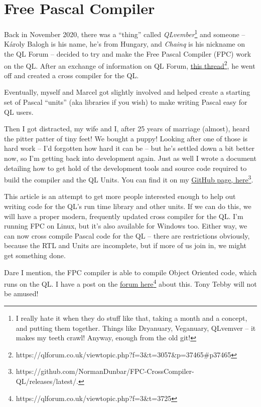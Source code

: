 
\chapter{Free Pascal Compiler}

Back in November 2020, there was a ``thing'' called \emph{QLvember}\footnote{I really hate it when they do stuff like that, taking a month and
a concept, and putting them together. Things like Dryanuary, Veganuary,
QLvemver -- it makes my teeth crawl! Anyway, enough from the old
git!} and someone -- K\'aroly Balogh is his name, he's from Hungary,
and \emph{Chainq} is his nickname on the QL Forum -- decided to try
and make the Free Pascal Compiler (FPC) work on the QL. After an exchange
of information on QL Forum, \href{https://qlforum.co.uk/viewtopic.php?f=3&t=3057&p=37465\#p37465}{this thread}\footnote{https://qlforum.co.uk/viewtopic.php?f=3\&t=3057\&p=37465\#p37465},
he went off and created a cross compiler for the QL.

Eventually, myself and Marcel got slightly involved and helped create
a starting set of Pascal ``units'' (aka libraries if you wish) to
make writing Pascal easy for QL users. 

Then I got distracted, my wife and I, after 25 years of marriage (almost),
heard the pitter patter of tiny feet! We bought a puppy! Looking after
one of those is hard work -- I'd forgotten how hard it can be --
but he's settled down a bit better now, so I'm getting back into development
again. Just as well I wrote a document detailing how to get hold of
the development tools and source code required to build the compiler
and the QL Units. You can find it on my \href{https://github.com/NormanDunbar/FPC-CrossCompiler-QL/releases/latest/.}{GitHub page, here}\footnote{https://github.com/NormanDunbar/FPC-CrossCompiler-QL/releases/latest/.}.

This article is an attempt to get more people interested enough to
help out writing code for the QL's run time library and other units.
If we can do this, we will have a proper modern, frequently updated
cross compiler for the QL. I'm running FPC on Linux, but it's also
available for Windows too. Either way, we can now cross compile Pascal
code for the QL -- there are restrictions obviously, because the
RTL and Units are incomplete, but if more of us join in, we might
get something done.

Dare I mention, the FPC compiler is able to compile Object Oriented
code, which runs on the QL. I have a post on the \href{https://qlforum.co.uk/viewtopic.php?f=3&t=3725}{forum here}\footnote{https://qlforum.co.uk/viewtopic.php?f=3\&t=3725}
about this. Tony Tebby will not be amused!

